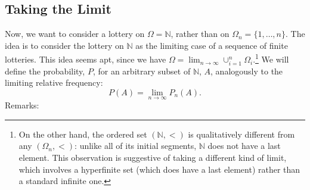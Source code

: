 \subsection{Taking the Limit}
Now, we want to consider a lottery on $\Omega=\mathbb{N}$, rather than on $\Omega_n=\{1,\ldots,n\}$.
The idea is to consider the lottery on $\mathbb{N}$ as the limiting case of a sequence of finite lotteries.
This idea seems apt, since we have $\Omega= \lim_{n\rightarrow\infty} \cup_{i=1}^{n} \Omega_i$.\footnote{On the other hand, the ordered set $(\mathbb{N},<)$ is qualitatively different from any $(\Omega_n,<)$: unlike all of its initial segments, $\mathbb{N}$ does not have a last element. This observation is suggestive of taking a different kind of limit, which involves a hyperfinite set (which does have a last element) rather than a standard infinite one.}
We will define the probability, $P$, for an arbitrary subset of $\mathbb{N}$, $A$, analogously to the limiting relative frequency:
$$ P(A)= \lim_{n\rightarrow\infty} P_n(A). $$
Remarks:
